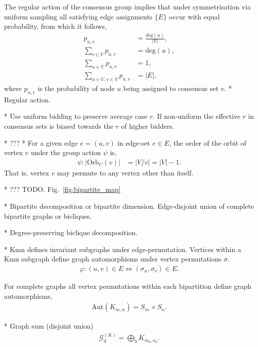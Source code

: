 \documentclass[twocolumn, aps, amsmath, amssymb, nofootinbib, superscriptaddress, longbibliography, floatfix, eqsecnum, rmp]{revtex4-2}
\begin{document}
The regular action of the consensus group implies that under symmetrisation via uniform sampling all satisfying edge assignments $\{E\}$ occur with equal probability, from which it follows,
\begin{align} \label{eq:prob_cons}
	p_{u,v} &= \frac{\mathrm{deg}(u)}{|V|},\nonumber\\
	\sum_{v\in V} p_{u,v} &= \mathrm{deg}(u),\nonumber\\
	\sum_{u\in U} p_{u,v} &= 1, \nonumber\\
	\sum_{u\in U, v\in V} p_{u,v} &= |E|,
\end{align}
where $p_{u,v}$ is the probability of node $u$ being assigned to consensus set $v$.
* Regular action.

* Use uniform bidding to preserve average case $r$. If non-uniform the effective $r$ in consensus sets is biased towards the $r$ of higher bidders.

* ???
* For a given edge $e=(u,v)$ in edge-set $e\in E$, the order of the orbit of vertex $v$ under the group action $\psi$ is,
\begin{align}
		\psi: |\mathrm{Orb}_C(v)| &= |V/v| = |V|-1.
\end{align}
That is, vertex $v$ may permute to any vertex other than itself.

* ??? TODO. Fig.~\ref{fig:bipartite_map}

* Bipartite decomposition or bipartite dimension. Edge-disjoint union of complete bipartite graphs or bicliques.

* Degree-preserving biclique decomposition.

* Kmn defines invariant subgraphs under edge-permutation. Vertices within a Kmn subgraph define graph automorphisms under vertex permutations $\sigma$.
\begin{align}
	\varphi: (u,v)\in E \Longleftrightarrow (\sigma_u,\sigma_v)	\in E.
\end{align}

For complete graphs all vertex permutations within each bipartition define graph automorphisms,
\begin{align}
	\mathrm{Aut}(K_{m,n}) = S_m\times S_n.
\end{align}


* Graph sum (disjoint union)
\begin{align}
\mathcal{G}_d^{(K)} = \bigoplus_{b} K_{m_b,n_b}.
\end{align}
\end{document}
